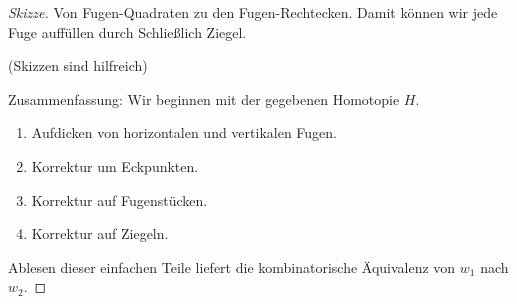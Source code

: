 \begin{st}
\begin{proof}[Skizze]
        Von Fugen-Quadraten zu den Fugen-Rechtecken.
        Damit können wir jede Fuge auffüllen durch
        Schließlich Ziegel.

        (Skizzen sind hilfreich)

        Zusammenfassung:
        Wir beginnen mit der gegebenen Homotopie $H$.
        \begin{enumerate}[1.]
            \item
                Aufdicken von horizontalen und vertikalen Fugen.
            \item
                Korrektur um Eckpunkten.
            \item
                Korrektur auf Fugenstücken.
            \item
                Korrektur auf Ziegeln.
        \end{enumerate}
        Ablesen dieser einfachen Teile liefert die kombinatorische Äquivalenz von $w_1$ nach $w_2$.
    \end{proof}
\end{st}

